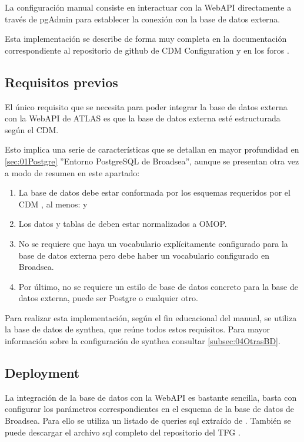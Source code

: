 La configuración manual consiste en interactuar con la WebAPI directamente a través de pgAdmin para establecer la conexión con la base de datos externa. 

Esta implementación se describe de forma muy completa en la documentación correspondiente al repositorio de github de CDM Configuration \cite{githubCDMConfig} y en los foros \cite{forumAddMSDB}\cite{forumBroadQuickStart}.

\subsection{Requisitos previos} \label{subsec:04RequisitosPrevios}

El único requisito que se necesita para poder integrar la base de datos externa con la WebAPI de ATLAS es que la base de datos externa esté estructurada según el CDM.

Esto implica una serie de características que se detallan en mayor profundidad en \ref{sec:01Postgre} ''Entorno PostgreSQL de Broadsea'', aunque se presentan otra vez a modo de resumen en este apartado:

\begin{enumerate}
    \item La base de datos debe estar conformada por los esquemas requeridos por el CDM \cite{githubCDMConfig}, al menos:  y 
    \item Los datos y tablas de  deben estar normalizados a OMOP.
    \item No se requiere que haya un vocabulario explícitamente configurado para la base de datos externa pero debe haber un vocabulario configurado en Broadsea.
    \item Por último, no se requiere un estilo de base de datos concreto para la base de datos externa, puede ser Postgre o cualquier otro. 
    
\end{enumerate}

Para realizar esta implementación, según el fin educacional del manual, se utiliza la base de datos de synthea, que reúne todos estos requisitos. Para mayor información sobre la configuración de synthea consultar \ref{subsec:04OtrasBD}.

\subsection{Deployment} \label{subsec:04deployment}

La integración de la base de datos con la WebAPI es bastante sencilla, basta con configurar los parámetros correspondientes en el esquema  de la base de datos de Broadsea. Para ello se utiliza un listado de queries sql extraído de \cite{githubCDMConfig}. También se puede descargar el archivo sql completo del repositorio del TFG \cite{vallealonsodc}.

